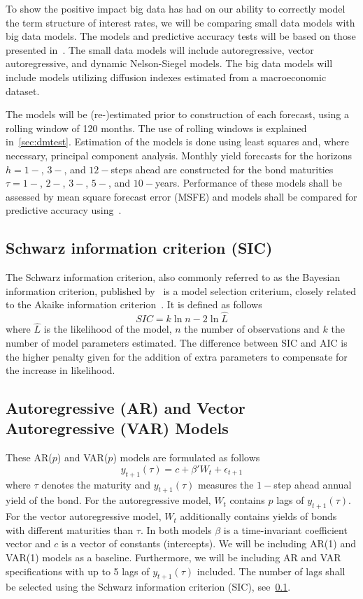 To show the positive impact big data has had on our ability to correctly model the term structure of interest rates, we will be comparing small data models with big data models. The models and predictive accuracy tests will be based on those presented in~\textcite{Swanson2017}. The small data models will include autoregressive, vector autoregressive, and dynamic Nelson-Siegel models. The big data models will include models utilizing diffusion indexes estimated from a macroeconomic dataset. 

The models will be (re-)estimated prior to construction of each forecast, using a rolling window of 120 months. The use of rolling windows is explained in~\cref{sec:dmtest}. Estimation of the models is done using least squares and, where necessary, principal component analysis. Monthly yield forecasts for the horizons $h = 1-$, $3-$, and $12-$steps ahead are constructed for the bond maturities $\tau = 1-$, $2-$, $3-$, $5-$, and $10-$years. Performance of these models shall be assessed by mean square forecast error (MSFE) and models shall be compared for predictive accuracy using~\textcite[hereafter DM]{Diebold1994}. 

\subsection{Schwarz information criterion (SIC)}
\label{sec:sic}
The Schwarz information criterion, also commonly referred to as the Bayesian information criterion, published by~\textcite[hereafter SIC]{Schwarz1978} is a model selection criterium, closely related to the Akaike information criterion~\parencite{Akaike1974}. It is defined as follows
\begin{equation}
	SIC = k\ln{n} - 2\ln{\hat{L}}
\end{equation}
where $\hat{L}$ is the likelihood of the model, $n$ the number of observations and $k$ the number of model parameters estimated. The difference between SIC and AIC is the higher penalty given for the addition of extra parameters to compensate for the increase in likelihood.

\subsection{Autoregressive (AR) and Vector Autoregressive (VAR) Models}
\label{sec:arvar}
These AR($p$) and VAR($p$) models are formulated as follows
\begin{equation}
	y_{t+1}(\tau) = c + \beta' W_t + \epsilon_{t+1}
\end{equation}
where $\tau$ denotes the maturity and $y_{t+1}(\tau)$ measures the $1-$step ahead annual yield of the bond. For the autoregressive model, $W_t$ contains $p$ lags of $y_{t+1}(\tau)$. For the vector autoregressive model, $W_t$ additionally contains yields of bonds with different maturities than $\tau$. In both models $\beta$ is a time-invariant coefficient vector and $c$ is a vector of constants (intercepts). We will be including AR(1) and VAR(1) models as a baseline. Furthermore, we will be including AR and VAR specifications with up to 5 lags of $y_{t+1}(\tau)$ included. The number of lags shall be selected using the Schwarz information criterion (SIC), see~\cref{sec:sic}. 

